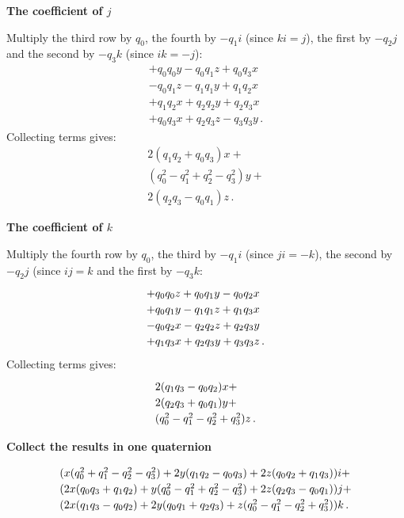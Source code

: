 \documentclass[11pt,a4paper]{report}
\newcommand*{\spacearray}{
\renewcommand{\arraystretch}{1.2}
\setlength{\arraycolsep}{4pt}
}
\begin{document}
\textbf{The coefficient of $j$}

Multiply the third row by $q_0$, the fourth by $-q_1i$ (since $ki=j$),
the first by $-q_2j$ and the second by $-q_3k$ (since $ik=-j$):
\begin{displaymath}
\begin{array}{l}
+q_0q_0y-q_0q_1z+q_0q_3x\\
-q_0q_1z-q_1q_1y+q_1q_2x\\
+q_1q_2x+q_2q_2y+q_2q_3x\\
+q_0q_3x+q_2q_3z-q_3q_3y\,.
\end{array}
\end{displaymath}
Collecting terms gives:
\begin{displaymath}
\begin{array}{l}
2(q_1q_2+q_0q_3)x+\\
(q_0^2-q_1^2+q_2^2-q_3^2)y+\\
2(q_2q_3-q_0q_1)z\,.
\end{array}
\end{displaymath}

\textbf{The coefficient of $k$}

Multiply the fourth row by $q_0$, the third by $-q_1i$ (since $ji=-k$), the second by $-q_2j$ (since $ij=k$ and the first by $-q_3k$:
\begin{displaymath}
\spacearray
\begin{array}{l}
+q_0q_0z+q_0q_1y-q_0q_2x\\
+q_0q_1y-q_1q_1z+q_1q_3x\\
-q_0q_2x-q_2q_2z+q_2q_3y\\
+q_1q_3x+q_2q_3y+q_3q_3z\,.
\end{array}
\end{displaymath}
Collecting terms gives:
\begin{displaymath}
\spacearray
\begin{array}{l}
2(q_1q_3-q_0q_2)x+\\
2(q_2q_3+q_0q_1)y+\\
(q_0^2-q_1^2-q_2^2+q_3^2)z\,.
\end{array}
\end{displaymath}

\textbf{Collect the results in one quaternion}

\begin{displaymath}
\spacearray
\begin{array}{l}
(x(q_0^2+q_1^2-q_2^2-q_3^2)+2y(q_1q_2-q_0q_3)+2z(q_0q_2+q_1q_3))i +\\
(2x(q_0q_3+q_1q_2)+y(q_0^2-q_1^2+q_2^2-q_3^2)+2z(q_2q_3-q_0q_1))j +\\
(2x(q_1q_3-q_0q_2)+2y(q_0q_1+q_2q_3)+z(q_0^2-q_1^2-q_2^2+q_3^2))k\,.
\end{array}
\end{displaymath}
\end{document}

